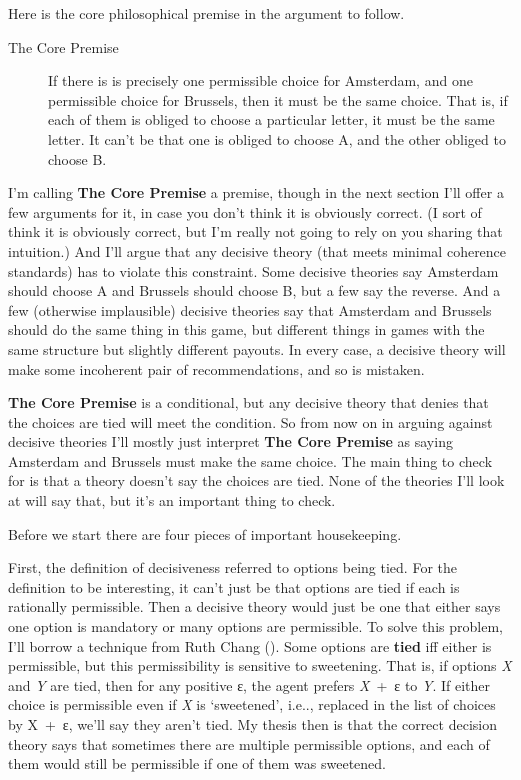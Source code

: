 \documentclass[
  10pt,
  letterpaper,
  DIV=11,
  numbers=noendperiod,
  twoside]{scrartcl}
\begin{document}
Here is the core philosophical premise in the argument to follow.

\begin{description}
\item[The Core Premise]
If there is is precisely one permissible choice for Amsterdam, and one
permissible choice for Brussels, then it must be the same choice. That
is, if each of them is obliged to choose a particular letter, it must be
the same letter. It can't be that one is obliged to choose A, and the
other obliged to choose B.
\end{description}

I'm calling \textbf{The Core Premise} a premise, though in the next
section I'll offer a few arguments for it, in case you don't think it is
obviously correct. (I sort of think it is obviously correct, but I'm
really not going to rely on you sharing that intuition.) And I'll argue
that any decisive theory (that meets minimal coherence standards) has to
violate this constraint. Some decisive theories say Amsterdam should
choose A and Brussels should choose B, but a few say the reverse. And a
few (otherwise implausible) decisive theories say that Amsterdam and
Brussels should do the same thing in this game, but different things in
games with the same structure but slightly different payouts. In every
case, a decisive theory will make some incoherent pair of
recommendations, and so is mistaken.

\textbf{The Core Premise} is a conditional, but any decisive theory that
denies that the choices are tied will meet the condition. So from now on
in arguing against decisive theories I'll mostly just interpret
\textbf{The Core Premise} as saying Amsterdam and Brussels must make the
same choice. The main thing to check for is that a theory doesn't say
the choices are tied. None of the theories I'll look at will say that,
but it's an important thing to check.

Before we start there are four pieces of important housekeeping.

First, the definition of decisiveness referred to options being tied.
For the definition to be interesting, it can't just be that options are
tied if each is rationally permissible. Then a decisive theory would
just be one that either says one option is mandatory or many options are
permissible. To solve this problem, I'll borrow a technique from Ruth
Chang (). Some options are \textbf{tied}
iff either is permissible, but this permissibility is sensitive to
sweetening. That is, if options \emph{X} and \emph{Y} are tied, then for
any positive ε, the agent prefers \emph{X}~+~ε to \emph{Y}. If either
choice is permissible even if \emph{X} is `sweetened', i.e.., replaced
in the list of choices by X~+~ε, we'll say they aren't tied. My thesis
then is that the correct decision theory says that sometimes there are
multiple permissible options, and each of them would still be
permissible if one of them was sweetened.
\end{document}
